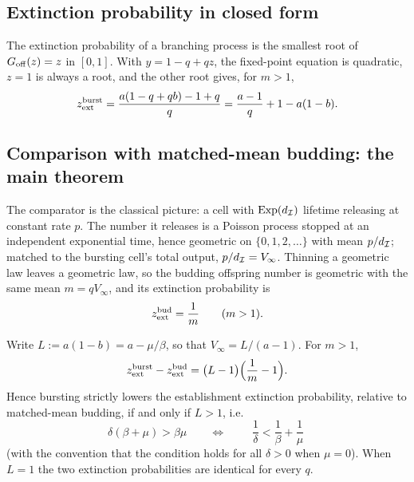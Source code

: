 \subsection{Extinction probability in closed form}

The extinction probability of a branching process is the smallest root of
$G_{\rm off}(z)=z$ in $[0,1]$. With $y=1-q+qz$, the fixed-point equation is
quadratic, $z=1$ is always a root, and the other root gives, for $m>1$,
\begin{equation}
z_{\rm ext}^{\rm burst}
=\frac{a(1-q+qb)-1+q}{q}
=\frac{a-1}{q}+1-a(1-b).
\label{eq:zext}
\end{equation}

\subsection{Comparison with matched-mean budding: the main theorem}

The comparator is the classical picture: a cell with $\mathrm{Exp}(d_{\mathcal{I}})$
lifetime releasing at constant rate $p$. The number it releases is a Poisson
process stopped at an independent exponential time, hence geometric on
$\{0,1,2,\ldots\}$ with mean $p/d_{\mathcal{I}}$; matched to the bursting cell's
total output, $p/d_{\mathcal{I}}=V_\infty$. Thinning a geometric law leaves a
geometric law, so the budding offspring number is geometric with the same
mean $m=qV_\infty$, and its extinction probability is
\begin{equation}
z_{\rm ext}^{\rm bud}=\frac{1}{m}\qquad(m>1).
\end{equation}

\begin{theorem}
\label{thm:flood}
Write $L:=a(1-b)=a-\mu/\beta$, so that $V_\infty=L/(a-1)$. For $m>1$,
\begin{equation}
z_{\rm ext}^{\rm burst}-z_{\rm ext}^{\rm bud}
=\bigl(L-1\bigr)\Bigl(\frac{1}{m}-1\Bigr).
\label{eq:flood}
\end{equation}
Hence bursting strictly lowers the establishment extinction probability,
relative to matched-mean budding, if and only if $L>1$, i.e.
\begin{equation}
\delta(\beta+\mu)>\beta\mu
\qquad\Longleftrightarrow\qquad
\boxed{\;\frac{1}{\delta}<\frac{1}{\beta}+\frac{1}{\mu}\;}
\end{equation}
(with the convention that the condition holds for all $\delta>0$ when
$\mu=0$). When $L=1$ the two extinction probabilities are identical for
every $q$.
\end{theorem}

